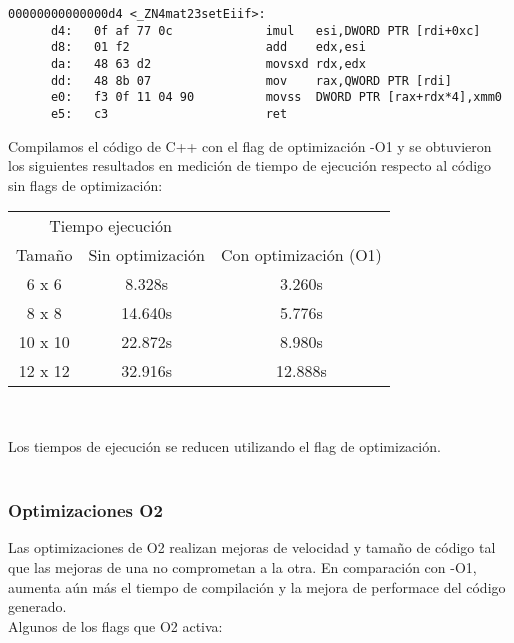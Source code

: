 \begin{verbatim}
00000000000000d4 <_ZN4mat23setEiif>:
      d4:	0f af 77 0c          	imul   esi,DWORD PTR [rdi+0xc]
      d8:	01 f2                	add    edx,esi
      da:	48 63 d2             	movsxd rdx,edx
      dd:	48 8b 07             	mov    rax,QWORD PTR [rdi]
      e0:	f3 0f 11 04 90       	movss  DWORD PTR [rax+rdx*4],xmm0
      e5:	c3                   	ret  
\end{verbatim}




Compilamos el código de C++ con el flag de optimización -O1 y se obtuvieron los siguientes resultados en medición de tiempo de ejecución respecto al código sin flags de optimización:\\

\begin{center}
	\begin{tabular}{ccc}  
		\toprule 
		\multicolumn{2}{c}{Tiempo ejecución} \\
		\cmidrule(r){1-3}
		Tamaño & Sin optimización & Con optimización (O1)  \\
		\midrule
		6 x 6   &	8.328s 	&	3.260s	\\
		8 x 8	&	14.640s	&	5.776s	\\
		10 x 10	&	22.872s	&	8.980s	\\
		12 x 12 &	32.916s &   12.888s \\
		\bottomrule
	\end{tabular}\\
\end{center}

Los tiempos de ejecución se reducen utilizando el flag de optimización.\\

~\\

\subsubsection{Optimizaciones O2}

Las optimizaciones de O2 realizan mejoras de velocidad y tamaño de código tal que las mejoras de una no comprometan a la otra. En comparación con -O1, aumenta aún más el tiempo de compilación y la mejora de performace del código generado.\\
Algunos de los flags que O2 activa:

